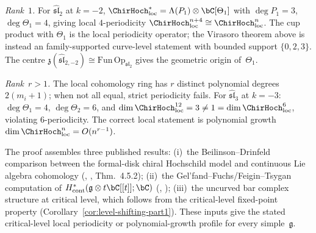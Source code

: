\begin{remark}\label{rem:rank-distinction}
\label{rem:affine-periodicity-analysis}
\emph{Rank~$1$.}
For $\hat{\mathfrak{sl}}_2$ at $k = -2$,
$\ChirHoch_{\mathrm{loc}}^* =
\Lambda(P_1) \otimes \bC[\Theta_1]$ with $\deg P_1 = 3$,
$\deg\Theta_1 = 4$, giving local $4$-periodicity
$\ChirHoch_{\mathrm{loc}}^{n+4}\cong
\ChirHoch_{\mathrm{loc}}^n$.  The cup product with $\Theta_1$ is the
local periodicity operator; the Virasoro theorem above is instead an
family-supported curve-level statement with bounded support
$\{0,2,3\}$.  The centre
$\mathfrak{z}(\hat{\mathfrak{sl}}_{2,-2}) \cong
\mathrm{Fun}\,\mathrm{Op}_{\mathfrak{sl}_2}$ gives the geometric
origin of~$\Theta_1$.

\emph{Rank~$r > 1$.}
The local cohomology ring has $r$ distinct polynomial degrees
$2(m_i + 1)$; when not all equal, strict periodicity fails. For
$\hat{\mathfrak{sl}}_3$ at $k = -3$: $\deg\Theta_1 = 4$,
$\deg\Theta_2 = 6$, and
$\dim \ChirHoch_{\mathrm{loc}}^{12}=3\neq1=
\dim \ChirHoch_{\mathrm{loc}}^6$, violating $6$-periodicity. The
correct local statement is polynomial growth
$\dim \ChirHoch_{\mathrm{loc}}^n=O(n^{r-1})$.
\end{remark}

\begin{remark}[Provenance]\label{rem:periodicity-provenance}
The proof assembles three published results:
(i)~the Beilinson--Drinfeld comparison between the formal-disk
chiral Hochschild model and continuous Lie algebra cohomology
(\ClaimStatusConditional,
\cite{BD04}, Thm.~4.5.2);
(ii)~the Gel'fand--Fuchs/Feigin--Tsygan computation of
$H^*_{\mathrm{cont}}(\mathfrak{g} \otimes t\bC[[t]]; \bC)$
(\ClaimStatusProvedElsewhere, \cite{FT87});
(iii)~the uncurved bar complex structure at critical level, which
follows from the critical-level fixed-point property
(Corollary~\ref{cor:level-shifting-part1}).
These inputs give the stated critical-level local periodicity or
polynomial-growth profile for every simple~$\mathfrak{g}$.
\end{remark}

